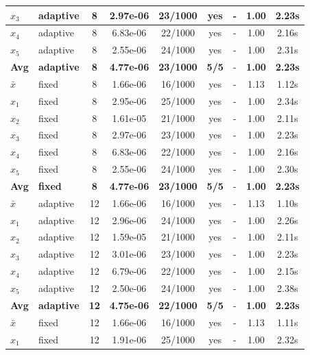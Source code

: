\begin{longtable}{|l|l|c|c|c|c|c|c|c|}
\hline
$x_3$ & adaptive & 8 & 2.97e-06 & 23/1000 & yes & - & 1.00 & 2.23s \\
\hline
$x_4$ & adaptive & 8 & 6.83e-06 & 22/1000 & yes & - & 1.00 & 2.16s \\
\hline
$x_5$ & adaptive & 8 & 2.55e-06 & 24/1000 & yes & - & 1.00 & 2.31s \\
\hline
\hline\hline
\textbf{Avg} & \textbf{adaptive} & \textbf{8} & \textbf{4.77e-06} & \textbf{23/1000} & \textbf{5/5} & - & \textbf{1.00} & \textbf{2.23s} \\
\hline\hline
\hline
$\bar{x}$ & fixed & 8 & 1.66e-06 & 16/1000 & yes & - & 1.13 & 1.12s \\
\hline
$x_1$ & fixed & 8 & 2.95e-06 & 25/1000 & yes & - & 1.00 & 2.34s \\
\hline
$x_2$ & fixed & 8 & 1.61e-05 & 21/1000 & yes & - & 1.00 & 2.11s \\
\hline
$x_3$ & fixed & 8 & 2.97e-06 & 23/1000 & yes & - & 1.00 & 2.23s \\
\hline
$x_4$ & fixed & 8 & 6.83e-06 & 22/1000 & yes & - & 1.00 & 2.16s \\
\hline
$x_5$ & fixed & 8 & 2.55e-06 & 24/1000 & yes & - & 1.00 & 2.30s \\
\hline
\hline\hline
\textbf{Avg} & \textbf{fixed} & \textbf{8} & \textbf{4.77e-06} & \textbf{23/1000} & \textbf{5/5} & - & \textbf{1.00} & \textbf{2.23s} \\
\hline\hline
$\bar{x}$ & adaptive & 12 & 1.66e-06 & 16/1000 & yes & - & 1.13 & 1.10s \\
\hline
$x_1$ & adaptive & 12 & 2.96e-06 & 24/1000 & yes & - & 1.00 & 2.26s \\
\hline
$x_2$ & adaptive & 12 & 1.59e-05 & 21/1000 & yes & - & 1.00 & 2.11s \\
\hline
$x_3$ & adaptive & 12 & 3.01e-06 & 23/1000 & yes & - & 1.00 & 2.23s \\
\hline
$x_4$ & adaptive & 12 & 6.79e-06 & 22/1000 & yes & - & 1.00 & 2.15s \\
\hline
$x_5$ & adaptive & 12 & 2.50e-06 & 24/1000 & yes & - & 1.00 & 2.38s \\
\hline
\hline\hline
\textbf{Avg} & \textbf{adaptive} & \textbf{12} & \textbf{4.75e-06} & \textbf{22/1000} & \textbf{5/5} & - & \textbf{1.00} & \textbf{2.23s} \\
\hline\hline
\hline
$\bar{x}$ & fixed & 12 & 1.66e-06 & 16/1000 & yes & - & 1.13 & 1.11s \\
\hline
$x_1$ & fixed & 12 & 1.91e-06 & 25/1000 & yes & - & 1.00 & 2.32s \\

\end{longtable}
